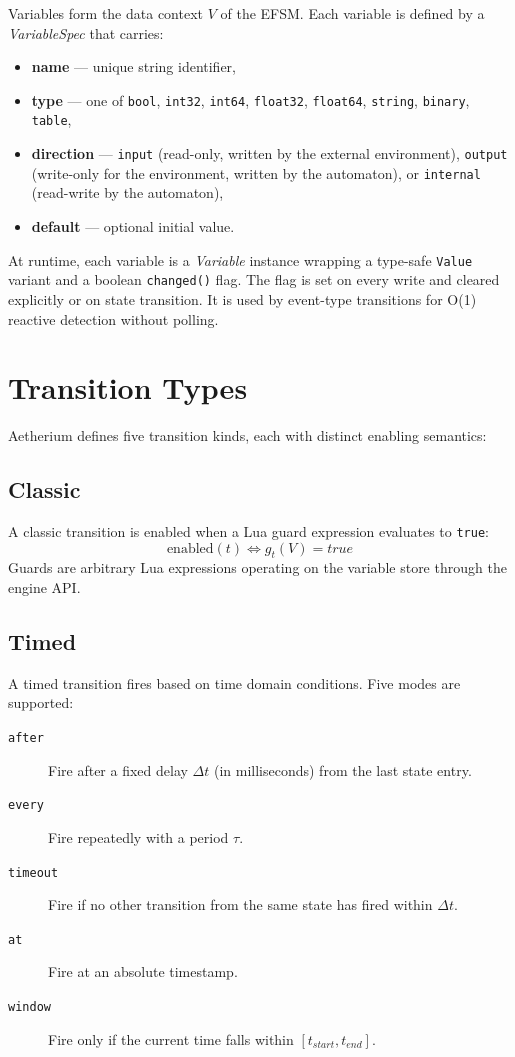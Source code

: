 Variables form the data context $V$ of the EFSM. Each variable is defined by a \textit{VariableSpec} that carries:
\begin{itemize}
  \item \textbf{name} --- unique string identifier,
  \item \textbf{type} --- one of \texttt{bool}, \texttt{int32}, \texttt{int64}, \texttt{float32}, \texttt{float64}, \texttt{string}, \texttt{binary}, \texttt{table},
  \item \textbf{direction} --- \texttt{input} (read-only, written by the external environment), \texttt{output} (write-only for the environment, written by the automaton), or \texttt{internal} (read-write by the automaton),
  \item \textbf{default} --- optional initial value.
\end{itemize}

At runtime, each variable is a \textit{Variable} instance wrapping a type-safe \texttt{Value} variant and a boolean \texttt{changed()} flag. The flag is set on every write and cleared explicitly or on state transition. It is used by event-type transitions for O(1) reactive detection without polling.

\section{Transition Types}
\label{sec:transitions}

Aetherium defines five transition kinds, each with distinct enabling semantics:

\subsection{Classic}

A classic transition is enabled when a Lua guard expression evaluates to \texttt{true}:
\begin{equation}
  \text{enabled}(t) \iff g_t(V) = \mathit{true}
\end{equation}
Guards are arbitrary Lua expressions operating on the variable store through the engine API.

\subsection{Timed}

A timed transition fires based on time domain conditions. Five modes are supported:
\begin{description}
  \item[\texttt{after}] Fire after a fixed delay $\Delta t$ (in milliseconds) from the last state entry.
  \item[\texttt{every}] Fire repeatedly with a period $\tau$.
  \item[\texttt{timeout}] Fire if no other transition from the same state has fired within $\Delta t$.
  \item[\texttt{at}] Fire at an absolute timestamp.
  \item[\texttt{window}] Fire only if the current time falls within $[t_\mathit{start}, t_\mathit{end}]$.
\end{description}

